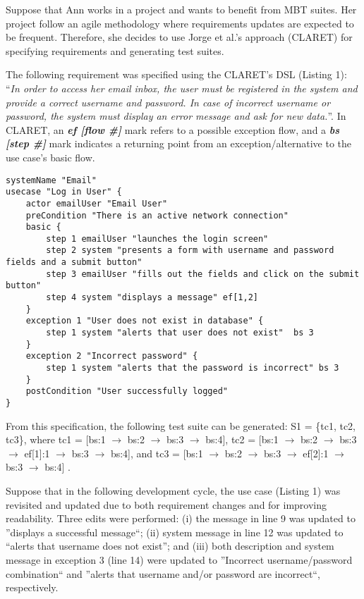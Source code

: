 Suppose that Ann works in a project and wants to benefit from MBT suites. Her project follow an agile methodology where requirements updates are expected to be frequent. Therefore, she decides to use Jorge et al.'s approach \cite{dalton2018mbtagile} (CLARET) for specifying requirements and generating test suites. 

The following requirement was specified using the CLARET's DSL (Listing 1): ``{\it In order to access her email inbox, the user must be registered in the system and provide a correct username and password. In case of incorrect username or password, the system must display an error message and ask for new data.}''. In CLARET, an \textit{\textbf{ef [flow \#]}} mark refers to a possible exception flow, and a \textbf{\textit{bs [step \#]}} mark indicates a returning point from an exception/alternative to the use case's basic flow.

\lstset{style=mystyle, language=claret}
 \begin{lstlisting}[float=b,caption=Use Case specification using CLARET.]
systemName "Email"
usecase "Log in User" {
	actor emailUser "Email User"
	preCondition "There is an active network connection"
	basic {
		step 1 emailUser "launches the login screen"
		step 2 system "presents a form with username and password fields and a submit button"
		step 3 emailUser "fills out the fields and click on the submit button"
		step 4 system "displays a message" ef[1,2]
	}
	exception 1 "User does not exist in database" {
		step 1 system "alerts that user does not exist"  bs 3
	}
	exception 2 "Incorrect password" {
		step 1 system "alerts that the password is incorrect" bs 3
	}
	postCondition "User successfully logged"
}
\end{lstlisting} \label{specExample}

From this specification, the following test suite can be generated: S1 = \{tc1, tc2, tc3\}, where tc1 = [bs:1 $\rightarrow$ bs:2 $\rightarrow$ bs:3 $\rightarrow$ bs:4], tc2 = [bs:1 $\rightarrow$ bs:2 $\rightarrow$ bs:3 $\rightarrow$ ef[1]:1 $\rightarrow$ bs:3 $\rightarrow$ bs:4], and tc3 = [bs:1 $\rightarrow$ bs:2 $\rightarrow$ bs:3 $\rightarrow$ ef[2]:1 $\rightarrow$ bs:3 $\rightarrow$ bs:4] .

Suppose that in the following development cycle, the use case (Listing 1) was revisited and updated due to both requirement changes and for improving readability. Three edits were performed: (i) the message in line 9 was updated to ''displays a successful message``; (ii) system message in line 12 was updated to ``alerts that username does not exist''; and (iii) both description and system message in exception 3 (line 14) were updated to ''Incorrect  username/password  combination`` and ''alerts  that  username  and/or  password  are incorrect``, respectively. 

